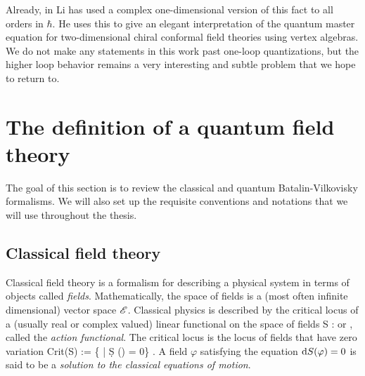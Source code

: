 \documentclass[10pt]{amsart}
\begin{document}
Already, in \cite{LiVertex} Li has used a complex one-dimensional version of this fact to all orders in $\hbar$. 
He uses this to give an elegant interpretation of the quantum master equation for two-dimensional chiral conformal field theories using vertex algebras.
We do not make any statements in this work past one-loop
quantizations, but the higher loop behavior remains a very interesting and subtle problem that we hope to return to.

\section{The definition of a quantum field theory}

The goal of this section is to review the classical and quantum Batalin-Vilkovisky formalisms.
We will also set up the requisite conventions and notations that we will use throughout the thesis. 

\subsection{Classical field theory}

Classical field theory is a formalism for describing a physical system in terms of objects called {\em fields}. 
Mathematically, the space of fields is a (most often infinite dimensional) vector space $\mathscr E$. 
Classical physics is described by the critical locus of a (usually real or complex valued) linear functional on the space of fields 
\be\label{actionfnl}
S : \sE \to \RR \;\; {\rm or} \;\; \CC,
\ee
called the {\em action functional}. 
The critical locus is the locus of fields that have zero variation
\be
{\rm Crit}(S) := \{\varphi \in \sE \; | \; \d S (\varphi) = 0\} .
\ee
A field $\varphi$ satisfying the equation ${\rm d} S (\varphi) = 0$ is said to be a {\em solution to the classical equations of motion}. 
\end{document}
